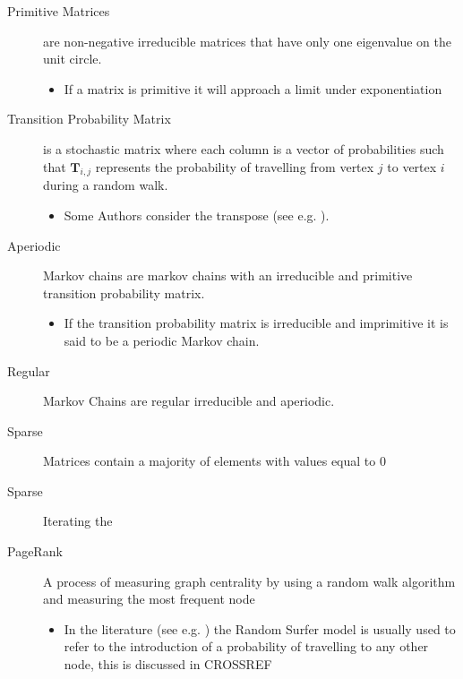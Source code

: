 \documentclass[11pt]{article}
\begin{document}
\begin{description}
\item[{Primitive Matrices}] are non-negative irreducible matrices that have only one eigenvalue on the unit circle.
\begin{itemize}
\item If a matrix is primitive it will approach a limit under exponentiation \cite[]{langvilleGooglePageRankScience2012}
\end{itemize}
\item[{Transition Probability Matrix}] is a stochastic matrix where each column is a vector of probabilities such that \(\mathbf{T}_{i,j}\) represents the probability of travelling from vertex \(j\) to vertex \(i\) during a random walk.
\begin{itemize}
\item Some Authors consider the transpose (see e.g. \cite{langvilleGooglePageRankScience2012}).
\end{itemize}
\item[{Aperiodic}] Markov chains are markov chains with an irreducible and primitive transition probability matrix.
\begin{itemize}
\item If the transition probability matrix is irreducible and imprimitive it is said to be a periodic Markov chain.
\end{itemize}
\item[{Regular}] Markov Chains are regular irreducible and aperiodic.
\item[{Sparse}] Matrices contain a majority of elements with values equal to 0 \cite[]{langvilleGooglePageRankScience2012}
\item[{Sparse}] Iterating the
\item[{PageRank}] A process of measuring graph centrality by using a random walk algorithm and measuring the most frequent node
\begin{itemize}
\item In the literature (see e.g. \cite{guptaWTFWhoFollow2013,langvilleGooglePageRankScience2012}) the Random Surfer model is usually used to refer to the introduction of a probability of travelling to any other node, this is discussed in CROSSREF
\end{itemize}
\end{description}
\end{document}
